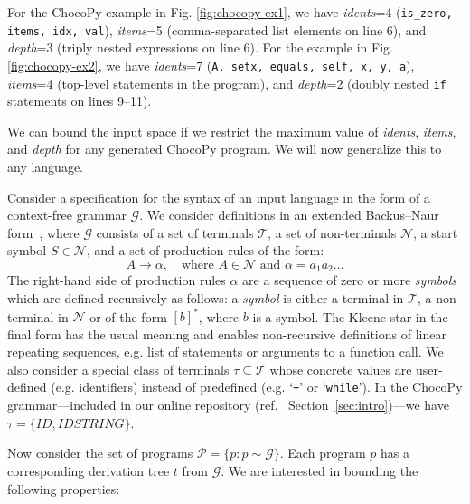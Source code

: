 \documentclass[conference]{IEEEtran}
\newcommand{\code}{\texttt}
\begin{document}
For the ChocoPy example in Fig. \ref{fig:chocopy-ex1}, we have \emph{idents}=4 (\code{is\_zero, items, idx, val}), \emph{items}=5 (comma-separated list elements on line 6), and \emph{depth}=3 (triply nested expressions on line 6). 
For the example in Fig. \ref{fig:chocopy-ex2}, we have \emph{idents}=7 (\code{A, setx, equals, self, x, y, a}), \emph{items}=4 (top-level statements in the program), and \emph{depth}=2 (doubly nested \code{if} statements on lines 9--11).

We can bound the input space if we restrict the maximum value of \emph{idents}, \emph{items}, and \emph{depth} for any generated ChocoPy program. 
We will now generalize this to any language.

Consider a specification for the syntax of an input language in the form of a context-free grammar $\mathcal{G}$. We consider definitions in an extended Backus–Naur form~\cite{EBNF96}, where $\mathcal{G}$ consists of a set of terminals $\mathcal{T}$, a set of non-terminals $\mathcal{N}$, a start symbol $S \in \mathcal{N}$, and a set of production rules of the form:
$$ A \longrightarrow \alpha, \quad\text{where $A \in \mathcal{N}$ and $\alpha = a_1 a_2 \ldots $}$$
\noindent The right-hand side of production rules $\alpha$ are a sequence of zero or more \emph{symbols} which are defined recursively as follows: a \emph{symbol} is either a terminal in $\mathcal{T}$, a non-terminal in $\mathcal{N}$ or of the form $[b]^*$, where $b$ is a symbol. The Kleene-star in the final form has the usual meaning and enables non-recursive definitions of linear repeating sequences, e.g. list of statements or arguments to a function call. We also consider a special class of terminals $\tau \subseteq \mathcal{T}$ whose concrete values are user-defined (e.g. identifiers) instead of predefined (e.g. `\code{+}' or `\code{while}'). In the ChocoPy grammar---included in our online repository (ref.~ Section~\ref{sec:intro})---we have $\tau = \{ \mathit{ID}, \mathit{IDSTRING} \}$.

Now consider the set of programs $\mathcal{P} = \{p : p \sim \mathcal{G}\}$. Each program $p$ has a corresponding derivation tree $t$ from $\mathcal{G}$. We are interested in bounding the following properties:
\end{document}
